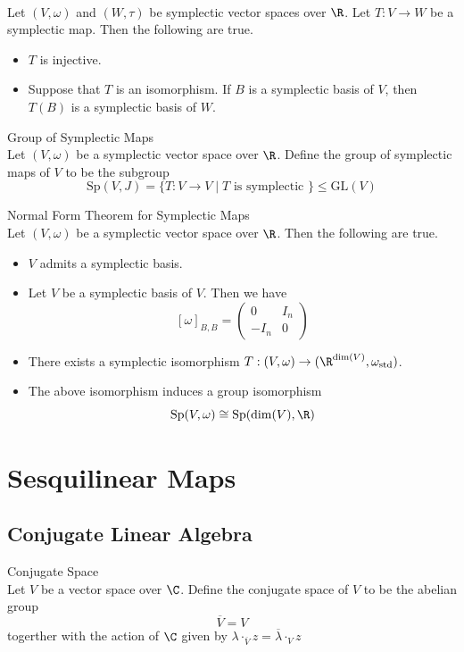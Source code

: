 \documentclass[a4paper]{article}
\begin{document}
\begin{prp}{}{}\\
Let $(V,\omega)$ and $(W,\tau)$ be symplectic vector spaces over $\R$. Let $T:V\to W$ be a symplectic map. Then the following are true. 
\begin{itemize}
\item $T$ is injective. 
\item Suppose that $T$ is an isomorphism. If $B$ is a symplectic basis of $V$, then $T(B)$ is a symplectic basis of $W$. 
\end{itemize}
\end{prp}

\begin{defn}{Group of Symplectic Maps}{}\\
Let $(V,\omega)$ be a symplectic vector space over $\R$. Define the group of symplectic maps of $V$ to be the subgroup $$\text{Sp}(V,J)=\{T:V\to V\;|\;T\text{ is symplectic }\}\leq\text{GL}(V)$$
\end{defn}

\begin{thm}{Normal Form Theorem for Symplectic Maps}{}\\
Let $(V,\omega)$ be a symplectic vector space over $\R$. Then the following are true. 
\begin{itemize}
\item $V$ admits a symplectic basis. 
\item Let $V$ be a symplectic basis of $V$. Then we have $$[\omega]_{B,B}=\begin{pmatrix}
0 & I_n\\
-I_n & 0
\end{pmatrix}$$
\item There exists a symplectic isomorphism $T:(V,\omega)\to(\R^{\dim(V)},\omega_\text{std})$. 
\item The above isomorphism induces a group isomorphism $$\text{Sp}(V,\omega)\cong\text{Sp}(\dim(V),\R)$$
\end{itemize}
\end{thm}

\pagebreak
\section{Sesquilinear Maps}
\subsection{Conjugate Linear Algebra}
\begin{defn}{Conjugate Space}{}\\
Let $V$ be a vector space over $\C$. Define the conjugate space of $V$ to be the abelian group $$\overline{V}=V$$ togerther with the action of $\C$ given by $\lambda\cdot_{\overline{V}} z=\overline{\lambda}\cdot_V z$
\end{defn}
\end{document}
